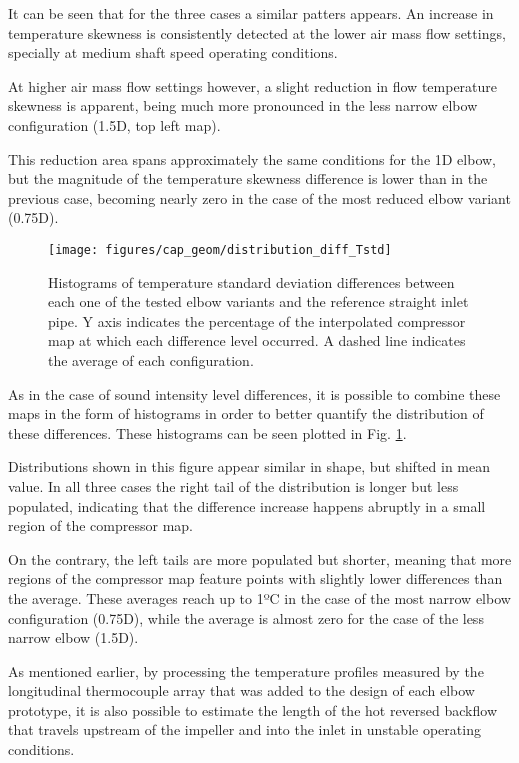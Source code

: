 It can be seen that for the three cases a similar patters appears. An increase in temperature skewness is consistently detected at the lower air mass flow settings, specially at medium shaft speed operating conditions.

At higher air mass flow settings however, a slight reduction in flow temperature skewness is apparent, being much more pronounced in the less narrow elbow configuration (1.5D, top left map). 

This reduction area spans approximately the same conditions for the 1D elbow, but the magnitude of the temperature skewness difference is lower than in the previous case, becoming nearly zero in the case of the most reduced elbow variant (0.75D).

\begin{figure}[htb!]
\centering
\texttt{[image: figures/cap\_geom/distribution\_diff\_Tstd]}
\caption[Difference histogram for temperature skewness]{Histograms of temperature standard deviation differences between each one of the tested elbow variants and the reference straight inlet pipe. Y axis indicates the percentage of the interpolated compressor map at which each difference level occurred. A dashed line indicates the average of each configuration.}
\label{fig:distribution_diff_std}
\end{figure}

As in the case of sound intensity level differences, it is possible to combine these maps in the form of histograms in order to better quantify the distribution of these differences. These histograms can be seen plotted in Fig. \ref{fig:distribution_diff_std}.

Distributions shown in this figure appear similar in shape, but shifted in mean value. In all three cases the right tail of the distribution is longer but less populated, indicating that the difference increase happens abruptly in a small region of the compressor map. 

On the contrary, the left tails are more populated but shorter, meaning that more regions of the compressor map feature points with slightly lower differences than the average. These averages reach up to 1ºC in the case of the most narrow elbow configuration (0.75D), while the average is almost zero for the case of the less narrow elbow (1.5D).

As mentioned earlier, by processing the temperature profiles measured by the longitudinal thermocouple array that was added to the design of each elbow prototype, it is also possible to estimate the length of the hot reversed backflow that travels upstream of the impeller and into the inlet in unstable operating conditions.

